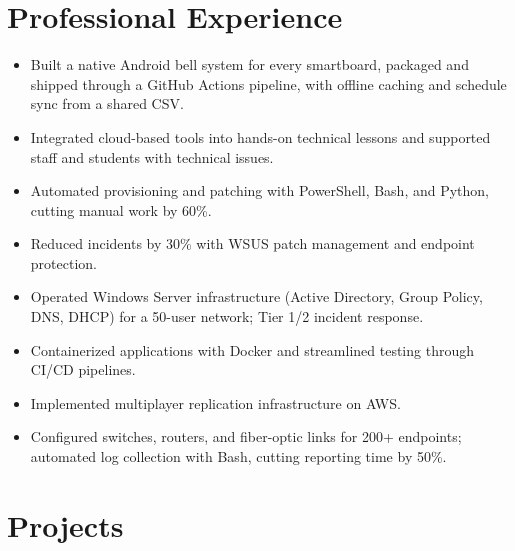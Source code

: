 \documentclass[a4paper,10pt]{article}
\begin{document}
\section*{Professional Experience}
\begin{itemize}
  \item Built a native Android bell system for every smartboard, packaged and shipped through a GitHub Actions pipeline, with offline caching and schedule sync from a shared CSV.
\end{itemize}
\begin{itemize}
  \item Integrated cloud-based tools into hands-on technical lessons and supported staff and students with technical issues.
\end{itemize}
\begin{itemize}
  \item Automated provisioning and patching with PowerShell, Bash, and Python, cutting manual work by 60\%.
  \item Reduced incidents by 30\% with WSUS patch management and endpoint protection.
  \item Operated Windows Server infrastructure (Active Directory, Group Policy, DNS, DHCP) for a 50-user network; Tier 1/2 incident response.
\end{itemize}
\begin{itemize}
  \item Containerized applications with Docker and streamlined testing through CI/CD pipelines.
  \item Implemented multiplayer replication infrastructure on AWS.
\end{itemize}
\begin{itemize}
  \item Configured switches, routers, and fiber-optic links for 200+ endpoints; automated log collection with Bash, cutting reporting time by 50\%.
\end{itemize}

\section*{Projects}
\pKube
\pAWSHA
\pCapstone
\pCICD
\pRobotShop
\end{document}
